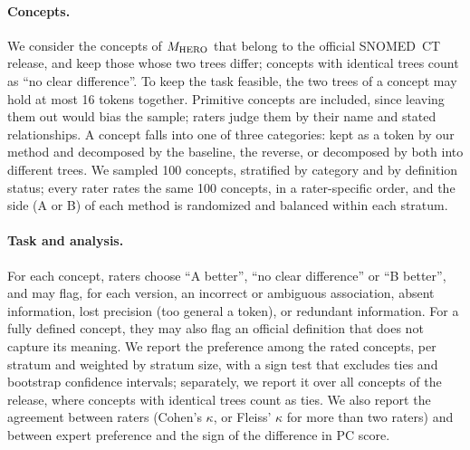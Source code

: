 \paragraph{Concepts.}
We consider the concepts of $M_{\mathrm{HERO}}$ that belong to the official SNOMED~CT release, and keep those whose two trees differ; concepts with identical trees count as ``no clear difference''.
To keep the task feasible, the two trees of a concept may hold at most 16 tokens together.
Primitive concepts are included, since leaving them out would bias the sample; raters judge them by their name and stated relationships.
A concept falls into one of three categories: kept as a token by our method and decomposed by the baseline, the reverse, or decomposed by both into different trees.
We sampled 100 concepts, stratified by category and by definition status; every rater rates the same 100 concepts, in a rater-specific order, and the side (A or B) of each method is randomized and balanced within each stratum.

\paragraph{Task and analysis.}
For each concept, raters choose ``A better'', ``no clear difference'' or ``B better'', and may flag, for each version, an incorrect or ambiguous association, absent information, lost precision (too general a token), or redundant information.
For a fully defined concept, they may also flag an official definition that does not capture its meaning.
We report the preference among the rated concepts, per stratum and weighted by stratum size, with a sign test that excludes ties and bootstrap confidence intervals; separately, we report it over all concepts of the release, where concepts with identical trees count as ties.
We also report the agreement between raters (Cohen's $\kappa$, or Fleiss' $\kappa$ for more than two raters) and between expert preference and the sign of the difference in PC score.
